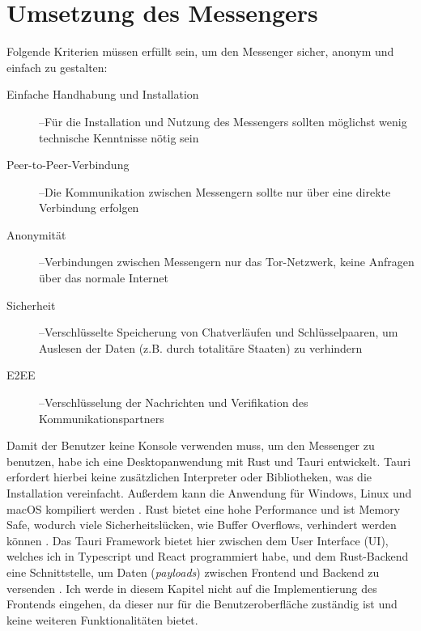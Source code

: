\documentclass[a4paper,ngerman, headheight=28pt,12pt, footheight=27pt]{scrartcl}
\newcommand{\LongMinus}{–}
\newcommand{\vcite}[1]{\cite[vgl.][]{#1}}
\begin{document}
\section{Umsetzung des Messengers}
Folgende Kriterien müssen erfüllt sein, um den Messenger sicher, anonym und einfach zu gestalten:
\begin{description}
  \item[Einfache Handhabung und Installation] \LongMinus Für die Installation und Nutzung des Messengers sollten möglichst wenig technische Kenntnisse nötig sein
  \item[Peer-to-Peer-Verbindung] \LongMinus Die Kommunikation zwischen Messengern sollte nur über eine direkte Verbindung erfolgen
  \item[Anonymität] \LongMinus Verbindungen zwischen Messengern nur das Tor-Netzwerk, keine Anfragen über das normale Internet
  \item[Sicherheit] \LongMinus Verschlüsselte Speicherung von Chatverläufen und Schlüsselpaaren, um Auslesen der Daten (z.B. durch totalitäre Staaten) zu verhindern
  \item[E2EE] \LongMinus Verschlüsselung der Nachrichten und Verifikation des Kommunikationspartners
\end{description}
Damit der Benutzer keine Konsole verwenden muss, um den Messenger zu benutzen, habe ich eine Desktopanwendung mit Rust und Tauri entwickelt. Tauri erfordert hierbei keine zusätzlichen Interpreter oder Bibliotheken, was die Installation vereinfacht.
Außerdem kann die Anwendung für Windows, Linux und macOS kompiliert werden \vcite{RustCompile}. Rust bietet eine hohe Performance und ist Memory Safe, wodurch viele Sicherheitslücken, wie Buffer Overflows, verhindert werden können \vcite{RustSecurity}. Das Tauri Framework bietet hier zwischen dem User Interface (UI), welches ich in Typescript und React programmiert habe, und dem Rust-Backend eine Schnittstelle, um Daten (\textit{payloads}) zwischen Frontend und Backend zu versenden \vcite{TauriPayloads}. Ich werde in diesem Kapitel nicht auf die Implementierung des Frontends eingehen, da dieser nur für die Benutzeroberfläche zuständig ist und keine weiteren Funktionalitäten bietet.
\end{document}
